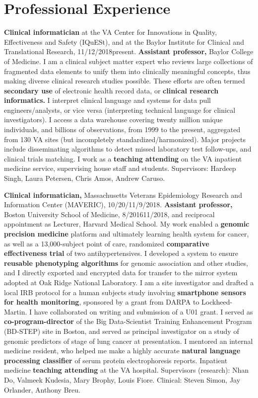 \documentclass[10pt]{article}
\begin{document}
\section*{Professional Experience} %

\textbf{Clinical informatician} at the VA Center for Innovations in
Quality, Effectiveness and Safety (IQuESt), and at the Baylor
Institute for Clinical and Translational Research,
11/12/2018\ndash{}present. \textbf{Assistant professor,} Baylor
College of Medicine. I am a clinical subject matter expert who reviews
large collections of fragmented data elements to unify them into
clinically meaningful concepts, thus making diverse clinical research
studies possible.  These efforts are often termed \textbf{secondary
  use} of electronic health record data, or \textbf{clinical research
  informatics.} I interpret clinical language and systems for data
pull engineers/analysts, or vice versa (interpreting technical
language for clinical investigators). I access a data warehouse
covering twenty million unique individuals, and billions of
observations, from 1999 to the present, aggregated from 130 VA sites
(but incompletely standardized/harmonized). Major projects include
disseminating algorithms to detect missed laboratory test follow-ups,
and clinical trials matching. I work as a \textbf{teaching
  attending} on the VA inpatient medicine service, supervising house
staff and students. Supervisors: Hardeep Singh, Laura
Petersen, Chris Amos, Andrew Caruso.

\textbf{Clinical informatician,} Massachusetts Veterans Epidemiology
Research and Information Center (MAVERIC),
10/20/\ndash{}11/9/2018. \textbf{Assistant
  professor,} Boston University School of Medicine,
8/2016\ndash{}11/2018, and reciprocal appointment as Lecturer, Harvard
Medical School. My work enabled a \textbf{genomic precision medicine}
platform and ultimately learning health system for cancer, as well as
a 13,000-subject point of care, randomized \textbf{comparative
  effectiveness trial} of two antihypertensives. I developed a system
to ensure \textbf{reusable phenotyping algorithms} for genomic
association and other studies, and I directly exported and encrypted
data for transfer to the mirror system adopted at Oak Ridge National
Laboratory. I am a site investigator and drafted a local IRB protocol
for a human subjects study involving \textbf{smartphone sensors for
  health monitoring}, sponsored by a grant from DARPA to
Lockheed-Martin. I have collaborated on writing and submission of a
U01 grant. I served as \textbf{co-program-director} of the Big
Data-Scientist Training Enhancement Program (BD-STEP) site in Boston,
and served as principal investigator on a study of genomic predictors
of stage of lung cancer at presentation. I mentored an internal
medicine resident, who helped me make a highly accurate
\textbf{natural language processing classifier} of serum protein
electrophoresis reports. Inpatient medicine \textbf{teaching
  attending} at the VA hospital. Supervisors (research): Nhan Do,
Valmeek Kudesia, Mary Brophy, Louis Fiore. Clinical: Steven Simon, Jay
Orlander, Anthony Breu.
\end{document}
